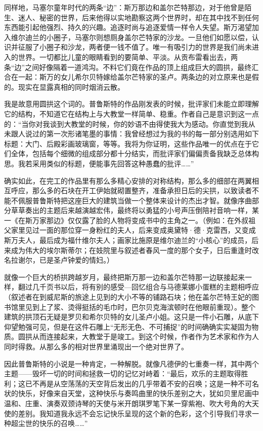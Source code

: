 \par 同样地，马塞尔童年时代的两条“边”：斯万那边和盖尔芒特那边，对于他曾是陌生、迷人、秘密的世界，后来他得以实地勘察这两个世界时，却在其中找不到任何东西能引起他强烈、持久的兴趣。追逐时尚与追逐爱情一样令人失望。斯万渴望加入维尔迪兰的小圈子，马塞尔则想厕身盖尔芒特家的沙龙。一旦他们如愿以偿，认识并征服了小圈子和沙龙，两者便一钱不值了。唯一有吸引力的世界是我们尚未进入的世界。一切都比儿童的眼睛看到的要简单、平淡。从贡布雷看出去，两条“边”之间好像隔着一道鸿沟。不料它们竟在作品的顶上组成巨大的圆拱，最终汇合在一起：斯万的女儿希尔贝特嫁给盖尔芒特家的圣卢。两条边的对立原来也是假的。现实在显露真相的同时烟消云散。
\par 我是故意用圆拱这个词的。普鲁斯特的作品刚发表的时候，批评家们未能立即理解它的结构，不知道它在结构上与大教堂一样简单、稳重。作者自己是意识到这一点的：“当你对我谈到大教堂的时候，你的妙语不由得使我大为感动。你直觉到我从未跟人说过的第一次形诸笔墨的事情：我曾经想过为我的书的每一部分别选用如下标题：大门、后殿彩画玻璃窗，等等。我将为你证明，这些作品唯一的优点在于它们全体，包括每个细微的组成部分都十分结实，而批评家们偏偏责备我缺乏总体构思。我若采用类似的标题，便能事先回答这种愚蠢的批评……”
\par 确实如此，在完工的作品里有那么多精心安排的对称结构，那么多的细部在两翼相互呼应，那么多的石块在开工伊始就砌置整齐，准备承担日后的尖拱，以致读者不能不佩服普鲁斯特把这座巨大的建筑当做一个整体来设计的杰出才智。就像序曲部分草草奏出的主题后来越演越宏伟，最终将以勇猛的小号声压倒陪衬音响一样，某一《在斯万家那边》仅仅露了脸的人物将变成书中的主角之一。（例如：在外叔祖父家里见过一面的那位穿一身粉红的夫人，后来变成奥黛特·德·克雷西，又变成斯万夫人，最后成为福什维尔夫人；画家比施原是维尔迪兰的“小核心”的成员，后来成为伟大的埃尔斯蒂尔；在妓院里与叙述者春风一度的那个女子，日后重逢时改名拉谢尔，已是圣卢钟爱的情妇。）
\par 就像一个巨大的桥拱跨越岁月，最终把斯万那一边和盖尔芒特那一边联接起来一样，翻过几千页书以后，将有别的感受—回忆组合与马德莱娜小蛋糕的主题相呼应（叙述者在到威尼斯的旅途上见到的大小不等的铺路石块；他在盖尔芒特王妃的图书馆里见到上了浆、烫得挺括的毛巾时，巴尔贝克海滨顿时在他眼前重现）。整个建筑的拱顶石无疑是罗贝和希尔贝特的女儿圣卢小姐。这只是一件小石雕，从底下仰望勉强可见，但是在这件石雕上“无形无色、不可捕捉”的时间确确实实凝固为物质。圆拱从而连接起来，大教堂于是竣工。到这个时候，作者作为艺术家和作为人同时得救。从那么多的相对世界里涌现出一个绝对世界了。
\par 因此普鲁斯特的小说是一种肯定，一种解脱。就像凡德伊的七重奏一样，其中两个主题——毁坏一切的时间和拯救一切的记忆对峙着：“最后，欢乐的主题取得胜利；这已不再是从空荡荡的天空背后发出的几乎带着不安的召唤；这是一种不可名状的快乐，好像来自天堂，这种快乐与奏鸣曲里的快乐差别之大，犹如贝里尼画中温和、庄重、演奏双颈诗琴的天使与米开朗琪罗笔下某一穿紫袍、吹大号角的大天使的差别。我知道我永远不会忘记快乐呈现的这个新的色彩，这个引导我们寻求一种超尘世的快乐的召唤……”
